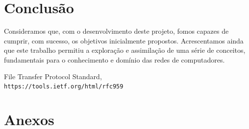 \documentclass{article}
\begin{document}
\section{Conclusão}
Consideramos que, com o desenvolvimento deste projeto, fomos capazes de cumprir, com sucesso, os objetivos inicialmente propostos.  Acrescentamos ainda que este trabalho permitiu a exploração e assimilação de uma série de conceitos, fundamentais para o conhecimento e domínio das redes de computadores.  

\begin{thebibliography}{1}
    File Transfer Protocol Standard,
    \\\texttt{https://tools.ietf.org/html/rfc959}
\end{thebibliography}
\section{Anexos}
\end{document}

